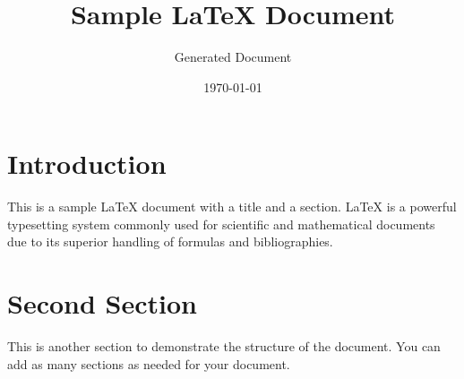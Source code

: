 \documentclass{article}
\title{Sample LaTeX Document}
\author{Generated Document}
\date{\today}
\begin{document}
\maketitle

\section{Introduction}
This is a sample LaTeX document with a title and a section. LaTeX is a powerful typesetting system commonly used for scientific and mathematical documents due to its superior handling of formulas and bibliographies.

\section{Second Section}
This is another section to demonstrate the structure of the document. You can add as many sections as needed for your document.
\end{document}
